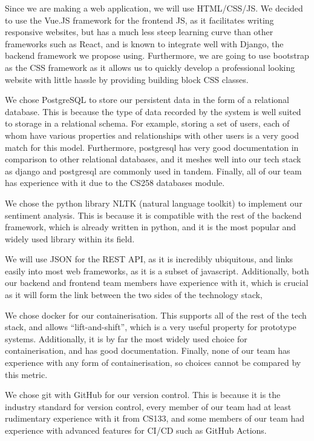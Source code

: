 \documentclass[10pt]{article}
\begin{document}
Since we are making a web application, we will use HTML/CSS/JS. We decided to
use the Vue.JS framework for the frontend JS, as it facilitates writing
responsive websites, but has a much less steep learning curve than other
frameworks such as React, and is known to integrate well with Django, the
backend framework we propose using. Furthermore, we are going to use bootstrap
as the CSS framework as it allows us to quickly develop a professional looking
website with little hassle by providing building block CSS classes.

We chose PostgreSQL to store our persistent data in the form of a relational
database. This is because the type of data recorded by the system is well suited
to storage in a relational schema. For example, storing a set of users, each of
whom have various properties and relationships with other users is a very good
match for this model. Furthermore, postgresql has very good documentation in
comparison to other relational databases, and it meshes well into our tech stack
as django and postgresql are commonly used in tandem. Finally, all of our team
has experience with it due to the CS258 databases module.

We chose the python library NLTK (natural language toolkit) to implement our
sentiment analysis. This is because it is compatible with the rest of the
backend framework, which is already written in python, and it is the most
popular and widely used library within its field.

We will use JSON for the REST API, as it is incredibly ubiquitous, and links
easily into most web frameworks, as it is a subset of javascript. Additionally,
both our backend and frontend team members have experience with it, which is
crucial as it will form the link between the two sides of the technology stack,

We chose docker for our containerisation. This supports all of the rest of the
tech stack, and allows “lift-and-shift”, which is a very useful property for
prototype systems. Additionally, it is by far the most widely used choice for
containerisation, and has good documentation. Finally, none of our team has
experience with any form of containerisation, so choices cannot be compared by
this metric.

We chose git with GitHub for our version control. This is because it is the
industry standard for version control, every member of our team had at least
rudimentary experience with it from CS133, and some members of our team had
experience with advanced features for CI/CD such as GitHub Actions.
\end{document}
